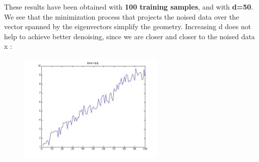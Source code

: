 These results have been obtained with \textbf{100 training samples}, and with \textbf{d=50}. We see that the minimization process that projects the noised data over the vector spanned by the eigenvectors simplify the geometry. Increasing d does not help to achieve better denoising, since we  are closer and closer to the noised data x :

\begin{figure}[H]
	\includegraphics[width=7cm]{plotError.jpg}
	\label{fig:awesome_image1}
	\endminipage\hfill
\end{figure}


